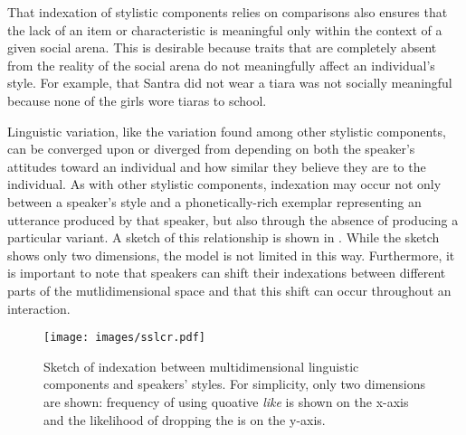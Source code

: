 That indexation of stylistic components relies on comparisons also ensures that the lack of an item or characteristic is meaningful only within the context of a given social arena.  This is desirable because traits that are completely absent from the reality of the social arena do not meaningfully affect an individual's style.  For example, that Santra did not wear a tiara was not socially meaningful because none of the girls wore tiaras to school.  

Linguistic variation, like the variation found among other stylistic components, can be converged upon or diverged from depending on both the speaker's attitudes toward an individual and how similar they believe they are to the indivi\-dual.  As with other stylistic components, indexation may occur not only between a speaker's style and a phonetically-rich exemplar representing an utterance produced by that speaker, but also through the absence of producing a particular variant.  A sketch of this relationship is shown in . While the sketch shows only two dimensions, the model is not limited in this way. Furthermore, it is important to note that speakers can shift their indexations between different parts of the mutlidimensional space and that this shift can occur throughout an interaction.

\begin{figure}
	\centering
		\texttt{[image: images/sslcr.pdf]} %
% 	
	\caption{Sketch of indexation between multidimensional linguistic components and speakers' styles. For simplicity, only two dimensions are shown: frequency of using quoative \textit{like} is shown on the x-axis and the likelihood of dropping the  is on the y-axis.}
	\label{fig:SketchStylesLing}
\end{figure}


